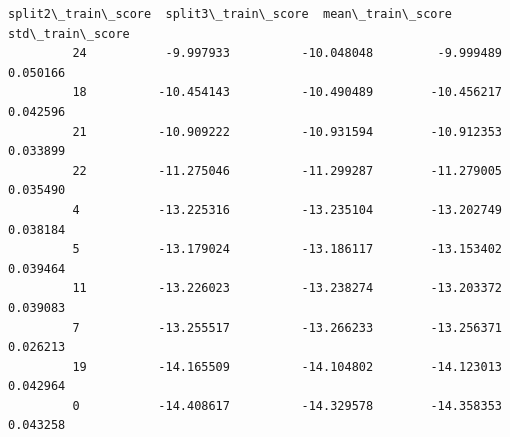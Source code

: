 \documentclass[11pt]{article}
\begin{document}
\begin{Verbatim}[commandchars=\\\{\}]
             split2\_train\_score  split3\_train\_score  mean\_train\_score  std\_train\_score  
         24           -9.997933          -10.048048         -9.999489         0.050166  
         18          -10.454143          -10.490489        -10.456217         0.042596  
         21          -10.909222          -10.931594        -10.912353         0.033899  
         22          -11.275046          -11.299287        -11.279005         0.035490  
         4           -13.225316          -13.235104        -13.202749         0.038184  
         5           -13.179024          -13.186117        -13.153402         0.039464  
         11          -13.226023          -13.238274        -13.203372         0.039083  
         7           -13.255517          -13.266233        -13.256371         0.026213  
         19          -14.165509          -14.104802        -14.123013         0.042964  
         0           -14.408617          -14.329578        -14.358353         0.043258  
\end{Verbatim}
            
\end{document}
